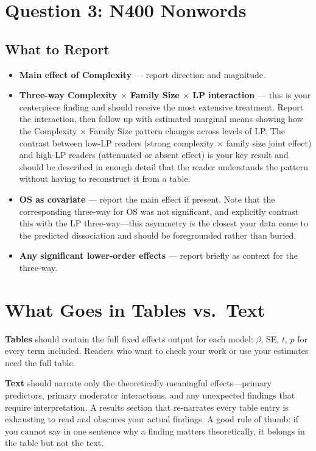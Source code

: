 \documentclass[12pt]{article}
\begin{document}
\section*{Question 3: N400 Nonwords}

\subsection*{What to Report}

\begin{itemize}
    \item \textbf{Main effect of Complexity} --- report direction and magnitude.
    \item \textbf{Three-way Complexity $\times$ Family Size $\times$ LP interaction} --- this is your centerpiece finding and should receive the most extensive treatment. Report the interaction, then follow up with estimated marginal means showing how the Complexity $\times$ Family Size pattern changes across levels of LP. The contrast between low-LP readers (strong complexity $\times$ family size joint effect) and high-LP readers (attenuated or absent effect) is your key result and should be described in enough detail that the reader understands the pattern without having to reconstruct it from a table.
    \item \textbf{OS as covariate} --- report the main effect if present. Note that the corresponding three-way for OS was not significant, and explicitly contrast this with the LP three-way---this asymmetry is the closest your data come to the predicted dissociation and should be foregrounded rather than buried.
    \item \textbf{Any significant lower-order effects} --- report briefly as context for the three-way.
\end{itemize}

\section*{What Goes in Tables vs.\ Text}

\textbf{Tables} should contain the full fixed effects output for each model: $\beta$, SE, $t$, $p$ for every term included. Readers who want to check your work or use your estimates need the full table.

\textbf{Text} should narrate only the theoretically meaningful effects---primary predictors, primary moderator interactions, and any unexpected findings that require interpretation. A results section that re-narrates every table entry is exhausting to read and obscures your actual findings. A good rule of thumb: if you cannot say in one sentence why a finding matters theoretically, it belongs in the table but not the text.
\end{document}
